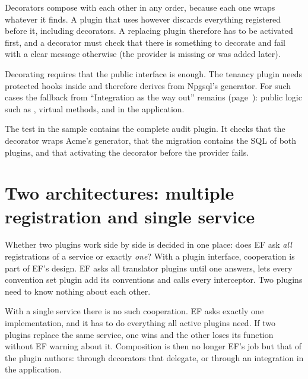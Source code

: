 \begin{important}
  Decorators compose with each other in any order, because each one wraps whatever it finds.
  A plugin that uses  however discards everything registered before it,
  including decorators. A replacing plugin therefore has to be activated first, and a
  decorator must check that there is something to decorate and fail with a clear message
  otherwise (the provider is missing or was added later).

  Decorating requires that the public interface is enough. The tenancy plugin needs
  protected hooks inside  and therefore derives from Npgsql's generator.
  For such cases the fallback from “Integration as the way out” remains
  (page~\pageref{sec:integration-way-out}): public logic such as
  , virtual methods, and
   in the application.
\end{important}

\begin{tip}
  The test  in the sample contains the complete audit
  plugin. It checks that the decorator wraps Acme's generator, that the migration contains
  the SQL of both plugins, and that activating the decorator before the provider fails.
\end{tip}

\section{Two architectures: multiple registration and single service}

Whether two plugins work side by side is decided in one place: does EF ask \emph{all}
registrations of a service or exactly \emph{one}? With a plugin interface, cooperation is
part of EF's design. EF asks all translator plugins until one answers, lets every convention
set plugin add its conventions and calls every interceptor. Two plugins need to know nothing
about each other.

With a single service there is no such cooperation. EF asks exactly one implementation, and
it has to do everything all active plugins need. If two plugins replace the same service,
one wins and the other loses its function without EF warning about it. Composition is then
no longer EF's job but that of the plugin authors: through decorators that delegate, or
through an integration in the application.

